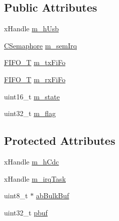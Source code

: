 \subsection*{Public Attributes}
\begin{DoxyCompactItemize}
\item 
x\-Handle \hyperlink{classusb_c_d_c_a8af7c1d1489eaa3fa35d140c1fb3e36b}{m\-\_\-h\-Usb}
\item 
\hyperlink{class_c_semaphore}{C\-Semaphore} \hyperlink{classusb_c_d_c_a9904020c60c4f19f92d12f539293dd1f}{m\-\_\-sem\-Irq}
\item 
\hyperlink{structfifo__t}{F\-I\-F\-O\-\_\-\-T} \hyperlink{classusb_c_d_c_acc8bfa27e6d3005950ccce1493de8f7b}{m\-\_\-tx\-Fi\-Fo}
\item 
\hyperlink{structfifo__t}{F\-I\-F\-O\-\_\-\-T} \hyperlink{classusb_c_d_c_abded5563b5ed9b2b05773e2756b4b147}{m\-\_\-rx\-Fi\-Fo}
\item 
uint16\-\_\-t \hyperlink{classusb_c_d_c_ae4f03edf64316170547608292d2d4c0e}{m\-\_\-state}
\item 
uint32\-\_\-t \hyperlink{classusb_c_d_c_a65b3a5365936dd08f69243e9d433d132}{m\-\_\-flag}
\end{DoxyCompactItemize}
\subsection*{Protected Attributes}
\begin{DoxyCompactItemize}
\item 
x\-Handle \hyperlink{classusb_c_d_c_a3e75d771150245f193312bd7bc8e6c6c}{m\-\_\-h\-Cdc}
\item 
x\-Handle \hyperlink{classusb_c_d_c_a9dd6cfe134ba6032c33b1f37b5260c73}{m\-\_\-irq\-Task}
\item 
uint8\-\_\-t $\ast$ \hyperlink{classusb_c_d_c_a6e7ef41e22502fc36c48311c8654bc37}{ab\-Bulk\-Buf}
\item 
uint32\-\_\-t \hyperlink{classusb_c_d_c_a4a1f881b570687525bb133ef2edfd8ae}{pbuf}
\end{DoxyCompactItemize}


